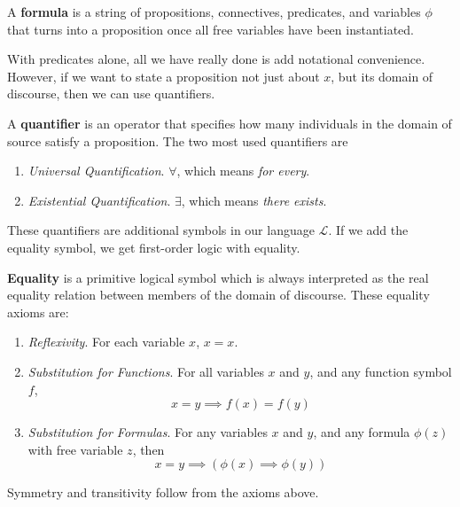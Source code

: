 \documentclass{article}
\begin{document}
  \begin{definition}[Formula]
    A \textbf{formula} is a string of propositions, connectives, predicates, and variables $\phi$ that turns into a proposition once all free variables have been instantiated. 
  \end{definition}

  With predicates alone, all we have really done is add notational convenience. However, if we want to state a proposition not just about $x$, but its domain of discourse, then we can use quantifiers. 

  \begin{definition}[Quantifier]
    A \textbf{quantifier} is an operator that specifies how many individuals in the domain of source satisfy a proposition. The two most used quantifiers are 
    \begin{enumerate}
      \item \textit{Universal Quantification}. $\forall$, which means \textit{for every}. 
      \item \textit{Existential Quantification}. $\exists$, which means \textit{there exists}. 
    \end{enumerate}
  \end{definition} 

  These quantifiers are additional symbols in our language $\mathcal{L}$. If we add the equality symbol, we get first-order logic with equality. 

  \begin{axiom}[Equality]
    \textbf{Equality} is a primitive logical symbol which is always interpreted as the real equality relation between members of the domain of discourse. These equality axioms are: 
    \begin{enumerate}
      \item \textit{Reflexivity}. For each variable $x$, $x = x$. 
      \item \textit{Substitution for Functions}. For all variables $x$ and $y$, and any function symbol $f$, 
        \begin{equation}
          x = y \implies f(x) = f(y)
        \end{equation}
      \item \textit{Substitution for Formulas}. For any variables $x$ and $y$, and any formula $\phi(z)$ with free variable $z$, then 
        \begin{equation}
          x = y \implies (\phi(x) \implies \phi(y))
        \end{equation}
    \end{enumerate}
    Symmetry and transitivity follow from the axioms above. 
  \end{axiom} 
\end{document}
